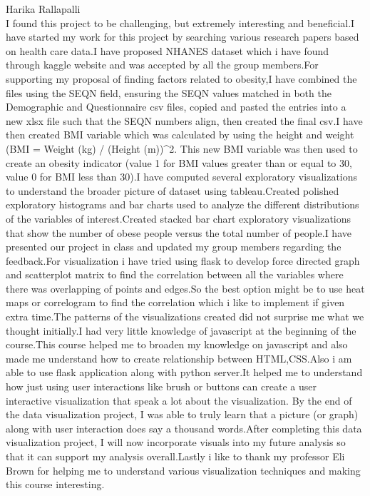 \documentclass[12pt]{article}
\numberwithin{figure}{section}
\begin{document}
{\sf Harika Rallapalli}\\
I found this project to be challenging, but extremely interesting and beneficial.I have started my work for this project by searching various research papers based on health care data.I have proposed NHANES dataset which i have found through kaggle website and was accepted by all the group members.For supporting my proposal of finding factors related to obesity,I have combined the files using the SEQN field, ensuring the SEQN values matched in both the Demographic and Questionnaire csv files, copied and pasted the entries into a new xlsx file such that the SEQN numbers align, then created the final csv.I have then created BMI variable which was calculated by using the height and weight (BMI = Weight (kg) / (Height (m))^2. This new BMI variable was then used to create an obesity indicator (value 1 for BMI values greater than or equal to 30, value 0 for BMI less than 30).I have computed several exploratory visualizations to understand the broader picture of dataset using tableau.Created polished exploratory histograms and bar charts used to analyze the different distributions of the variables of interest.Created stacked bar chart exploratory visualizations that show the number of obese people versus the total number of people.I have presented our project in class and updated my group members regarding the feedback.For visualization i have tried using flask to develop force directed graph and scatterplot matrix to find the correlation between all the variables where there was overlapping of points and edges.So the best option might be to use heat maps or correlogram to find the correlation which i like to implement if given extra time.The patterns of the visualizations created did not surprise me what we thought initially.I had very little knowledge of javascript at the beginning of the course.This course helped me to broaden my knowledge on javascript and also made me understand how to create relationship between HTML,CSS.Also i am able to use flask application along with python server.It helped me to understand how just using user interactions like brush or buttons can create a user interactive visualization that speak a lot about the visualization.
By the end of the data visualization project, I was able to truly learn that a picture (or graph) along with user interaction does say a thousand words.After completing this data visualization project, I will now incorporate visuals into my future analysis so that it can support my analysis overall.Lastly i like to thank my professor Eli Brown for helping me to understand various visualization techniques and making this course interesting.
\end{document}
